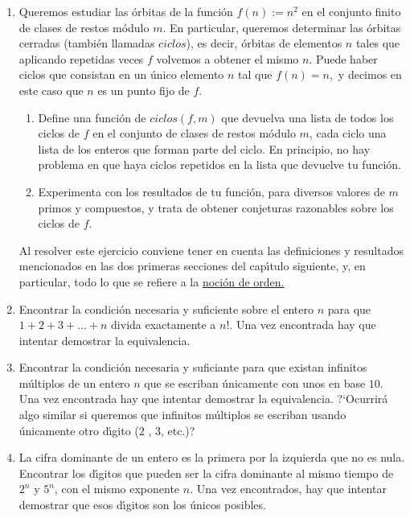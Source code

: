 \begin{enumerate}
\item \label{pr-ej8} Queremos estudiar las órbitas de la función $f(n):=n^2$ en el conjunto finito de clases de restos módulo $m$. En particular, queremos determinar las órbitas cerradas (también llamadas $ciclos$),  es decir, órbitas de elementos $n$ tales que aplicando repetidas veces $f$ volvemos a obtener el mismo  $n$. Puede haber ciclos que consistan en un único elemento $n$ tal que $f(n)=n,$ y decimos en este caso que $n$ es un punto fijo de $f$.
\begin{enumerate}
 \item    Define una función de {\sage}  $ciclos(f,m)$ que devuelva una lista de todos los ciclos de $f$ en  el conjunto  de clases de restos módulo $m$, cada ciclo una lista de los enteros que forman parte del ciclo. En principio, no hay problema en que haya ciclos repetidos en la lista que devuelve tu función. 
  \item   Experimenta con los resultados de tu función, para diversos valores de $m$ primos y compuestos,  y trata de obtener conjeturas razonables sobre los ciclos de $f$.
\end{enumerate}

Al resolver este ejercicio conviene tener en cuenta las definiciones y resultados mencionados en las dos primeras secciones del cap\'{\i}tulo siguiente, y, en particular, todo lo que se refiere a la \hyperref[orden]{noci\'on de orden.} 

\item Encontrar la condici\'on necesaria y suficiente sobre el entero $n$ para que $1+2+3+\dots+n$ divida exactamente a $n!.$ Una vez encontrada hay que intentar demostrar la equivalencia.

\item Encontrar la condici\'on necesaria y suficiante para que existan infinitos m\'ultiplos de un entero $n$ que se escriban \'unicamente con unos en base $10$.  Una vez encontrada hay que intentar demostrar la equivalencia. ?`Ocurrir\'a algo similar  si queremos que infinitos m\'ultiplos se escriban usando \'unicamente otro d\'{\i}gito ($2$ , $3$, etc.)? 

\item La cifra dominante de un entero es la primera por la izquierda que no es nula. Encontrar los d\'{\i}gitos   que pueden ser la cifra dominante al mismo tiempo de $2^n$ y $5^n$, con el mismo exponente $n$.  Una vez encontrados, hay que intentar demostrar que esos d\'{\i}gitos son los \'unicos posibles. 


\end{enumerate}
